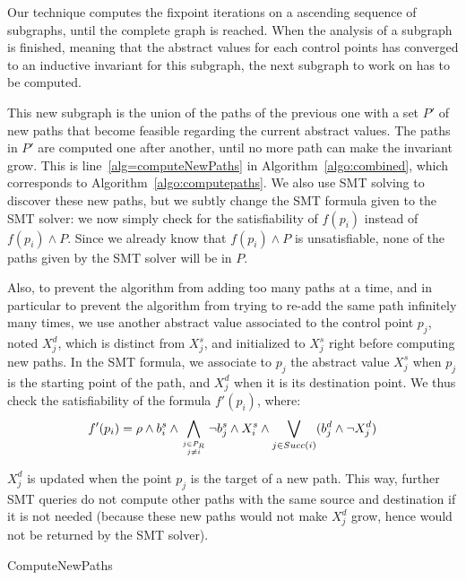 \documentclass[preprint]{sigplanconf}
\begin{document}
Our technique computes the fixpoint iterations on a ascending sequence of
subgraphs, until the complete graph is reached.
When the analysis of a subgraph is finished, meaning that the abstract values
for each control points has converged to an inductive invariant for this subgraph,
the next subgraph to work on has to be computed.

This new subgraph is the union of the paths of the previous one with a set
$P'$ of new paths that become feasible regarding the current abstract values.
The paths in $P'$ are computed one after another, until no more path
can make the invariant grow. This is line~\ref{alg=computeNewPaths} in
Algorithm~\ref{algo:combined}, which corresponds to
Algorithm~\ref{algo:computepaths}. We also use SMT solving to discover
these new paths, but we subtly change the SMT formula given to the
SMT solver: we now simply check for the satisfiability of $f(p_i)$
instead of $f(p_i) \wedge P$. Since we already know that $f(p_i)
\wedge P$ is unsatisfiable, none of the paths given by the SMT solver
will be in $P$.

Also, to prevent the algorithm from adding too many paths at a time,
and in particular to prevent the algorithm from trying to re-add the
same path infinitely many times, we use another abstract value
associated to the control point $p_j$, noted $X_j^d$, which is distinct
from $X_j^s$, and initialized to $X_j^s$ right before computing new paths. 
In the SMT formula, we associate to $p_j$ the abstract value $X_j^s$ when $p_j$
is the starting point of the path, and $X_j^d$ when it is its destination point.
We thus check the satisfiability of the formula
$f'(p_i)$, where:
$$f'(p_i) = \rho \wedge b_i^s \wedge 
\displaystyle\bigwedge_{j \in P_R \atop j \neq i} \neg
b_j^s \wedge X_i^s \wedge \displaystyle\bigvee_{j \in Succ(i)} (b_j^d \wedge
\neg X_j^d)$$

$X_j^d$ is updated when the point $p_j$ is the target of a new path.
This way, further SMT queries do not
compute other paths with the same source and destination if it is not
needed (because these new paths would not make $X_j^d$ grow, hence
would not be returned by the SMT solver).

\begin{algorithm}
	\caption{ComputeNewPaths}
	\label{algo:computepaths}
	\begin{algorithmic}[1] 
	
	\end{algorithmic}
\end{algorithm}
\end{document}
